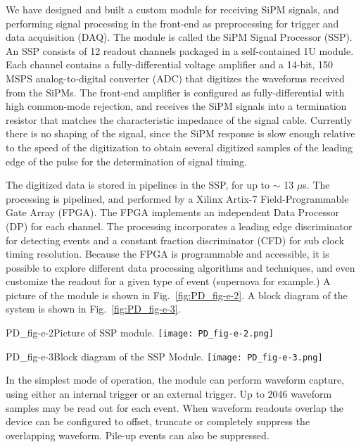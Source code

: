 We have designed and built a 
custom module for receiving SiPM signals, and performing signal 
processing in the front-end as preprocessing for trigger and data acquisition (DAQ).  
The module is called the SiPM Signal Processor (SSP).  
An SSP consists of 12 readout channels packaged in a self-contained 
1U module.  
Each channel contains a fully-differential voltage amplifier and a 
14-bit, 150 MSPS analog-to-digital converter (ADC) that 
digitizes the waveforms received from the SiPMs.  
The front-end amplifier is configured as fully-differential with high common-mode 
rejection, and receives the SiPM signals into a termination resistor that 
matches the characteristic impedance of the signal cable. 
Currently there is no shaping of the signal, since the SiPM response 
is slow enough relative to the speed of the digitization to obtain 
several digitized samples of the leading edge of the pulse for the determination of signal timing.  

The digitized data is stored in pipelines in the SSP, for up to $\sim$ 13 $\mu$s.  
The processing is pipelined, and performed by a Xilinx Artix-7 
Field-Programmable Gate Array (FPGA).  
The FPGA implements an independent Data Processor (DP) for each channel.  
The processing incorporates a leading edge discriminator for detecting events
and a constant fraction discriminator (CFD) for sub 
clock timing resolution.  
Because the FPGA is programmable and accessible, it is possible to explore 
different data processing algorithms and techniques, and even customize the 
readout for a given type of event (supernova for example.)  
A picture of the module is shown in Fig.~\ref{fig:PD_fig-e-2}.  
A block diagram of the system is shown in Fig.~\ref{fig:PD_fig-e-3}.
%
\begin{cdrfigure}{PD_fig-e-2}{Picture of SSP module.}
  \texttt{[image: PD\_fig-e-2.png]}
\end{cdrfigure}
%
%
\begin{cdrfigure}{PD_fig-e-3}{Block diagram of the SSP Module.}
  \texttt{[image: PD\_fig-e-3.png]}
\end{cdrfigure}
%
In the simplest mode of operation, the module can perform waveform capture, 
using either an internal trigger or an external trigger.  
Up to 2046 waveform samples may be read out for each event.  When waveform 
readouts overlap the device can be configured to offset, 
truncate or completely suppress the overlapping waveform.  
Pile-up events can also be suppressed.  

